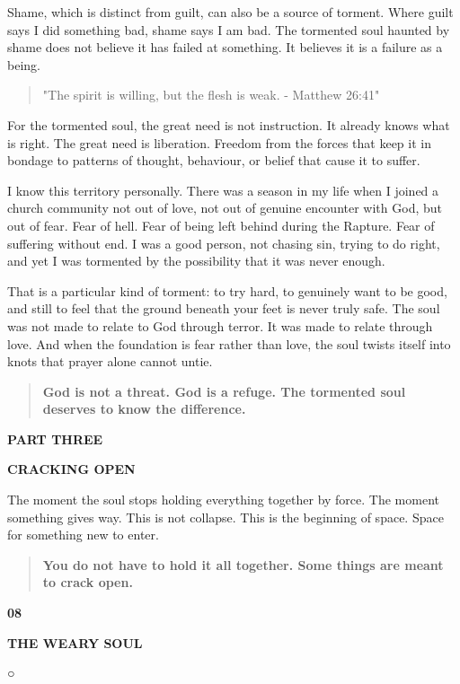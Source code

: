 Shame, which is distinct from guilt, can also be a source of torment.
Where guilt says I did something bad, shame says I am bad. The tormented
soul haunted by shame does not believe it has failed at something. It
believes it is a failure as a being.

\begin{quote}
"The spirit is willing, but the flesh is weak. - Matthew 26:41"
\end{quote}

For the tormented soul, the great need is not instruction. It already
knows what is right. The great need is liberation. Freedom from the
forces that keep it in bondage to patterns of thought, behaviour, or
belief that cause it to suffer.

I know this territory personally. There was a season in my life when I
joined a church community not out of love, not out of genuine encounter
with God, but out of fear. Fear of hell. Fear of being left behind
during the Rapture. Fear of suffering without end. I was a good person,
not chasing sin, trying to do right, and yet I was tormented by the
possibility that it was never enough.

That is a particular kind of torment: to try hard, to genuinely want to
be good, and still to feel that the ground beneath your feet is never
truly safe. The soul was not made to relate to God through terror. It
was made to relate through love. And when the foundation is fear rather
than love, the soul twists itself into knots that prayer alone cannot
untie.

\begin{quote}
\textbf{God is not a threat. God is a refuge. The tormented soul
deserves to know the difference.}
\end{quote}

\textbf{PART THREE}

\textbf{CRACKING OPEN}

The moment the soul stops holding everything together by force. The
moment something gives way. This is not collapse. This is the beginning
of space. Space for something new to enter.

\begin{quote}
\textbf{You do not have to hold it all together. Some things are meant
to crack open.}
\end{quote}

\textbf{08}

\textbf{THE WEARY SOUL}

○


